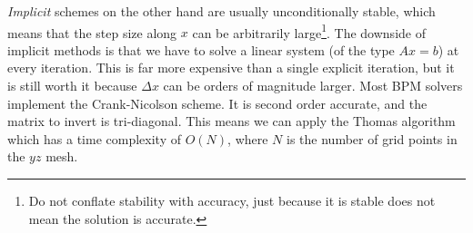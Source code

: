 \documentclass[]{article}
\begin{document}
	\textit{Implicit} schemes on the other hand are usually unconditionally stable, which means that the step size along $x$ can be arbitrarily large\footnote{Do not conflate stability with accuracy, just because it is stable does not mean the solution is accurate.}. The downside of implicit methods is that we have to solve a linear system (of the type $Ax=b$) at every iteration. This is far more expensive than a single explicit iteration, but it is still worth it because $\Delta x$ can be orders of magnitude larger. Most BPM solvers implement the Crank-Nicolson scheme. It is second order accurate, and the matrix to invert is tri-diagonal. This means we can apply the Thomas algorithm which has a time complexity of $O(N)$, where $N$ is the number of grid points in the $yz$ mesh.\\
	
\end{document}
